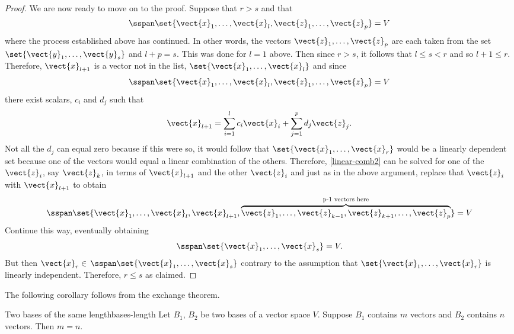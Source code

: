 \begin{proof}
We are now ready to move on to the proof. Suppose that $r>s$ and that
\[
\sspan\set{\vect{x}_{1},\ldots,
\vect{x}_{l},\vect{z}_{1},\ldots,\vect{z}_{p}} =V
\]
 where the process established above has continued. In other words, the vectors $\vect{z}_{1},\ldots,\vect{z}_{p}$ are each taken from the
set $\set{\vect{y}_{1},\ldots,\vect{y}_{s}} $ and $l+p=s$.
This was done for $l=1$ above. Then since $r>s$, it follows that $
l\leq s<r$ and so $l+1\leq r$. Therefore, $\vect{x}_{l+1}$ is a vector not
in the list, $\set{\vect{x}_{1},\ldots,\vect{x}_{l}} $ and
since
\[
\sspan\set{\vect{x}_{1},\ldots,\vect{x}_{l},\vect{z}
_{1},\ldots,\vect{z}_{p}} =V
\]
 there exist scalars, $c_{i}$ and $
d_{j}$ such that
\begin{equation}
\vect{x}_{l+1}=\sum_{i=1}^{l}c_{i}\vect{x}_{i}+\sum_{j=1}^{p}d_{j}
\vect{z}_{j}.  \label{linear-comb2}
\end{equation}
Not all the $d_{j}$ can equal zero because if this were so, it would follow
that $\set{\vect{x}_{1},\ldots,\vect{x}_{r}} $ would be a
linearly dependent set because one of the vectors would equal a linear
combination of the others. Therefore, {\eqref{linear-comb2}} can be solved for one of the
$\vect{z}_{i}$, say $\vect{z}_{k}$, in terms of $\vect{x}_{l+1}$ and
the other $\vect{z}_{i}$ and just as in the above argument, replace that $
\vect{z}_{i}$ with $\vect{x}_{l+1}$ to obtain
\begin{equation*}
\sspan\set{\vect{x}_{1},\ldots,\vect{x}_{l},\vect{x}_{l+1},
\overset{\text{p-1 vectors here}}{\overbrace{\vect{z}_{1},\ldots,\vect{z}
_{k-1},\vect{z}_{k+1},\ldots,\vect{z}_{p}}}} =V
\end{equation*}
Continue this way, eventually obtaining
\begin{equation*}
\sspan\set{\vect{x}_{1},\ldots,\vect{x}_{s}} =V.
\end{equation*}
But then $\vect{x}_{r}\in $ $\sspan\set{\vect{x}_{1},\ldots,
\vect{x}_{s}} $ contrary to the assumption that $\set{\vect{x}
_{1},\ldots,\vect{x}_{r}} $ is linearly independent. Therefore, $
r\leq s$ as claimed.
\end{proof}

The following corollary follows from the exchange theorem.

\begin{corollary}{Two bases of the same length}{bases-length}
Let $B_1$, $B_2$ be two bases of a vector space $V$. Suppose $B_1$ contains $m$ vectors and $B_2$ contains $n$ vectors. Then $m = n$.
\end{corollary}

